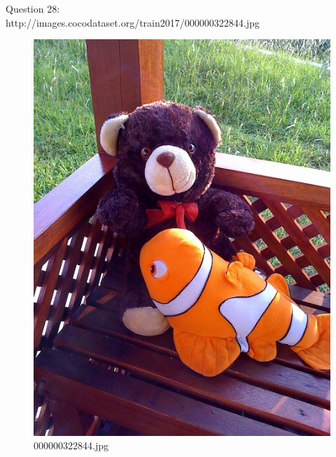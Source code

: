     Question 28:\\http://images.cocodataset.org/train2017/000000322844.jpg
    \begin{figure}[h]
        \centering
        \includegraphics[width=0.8\linewidth]{../image set/easy/000000322844.jpg}
        \caption{000000322844.jpg}
    \end{figure}
